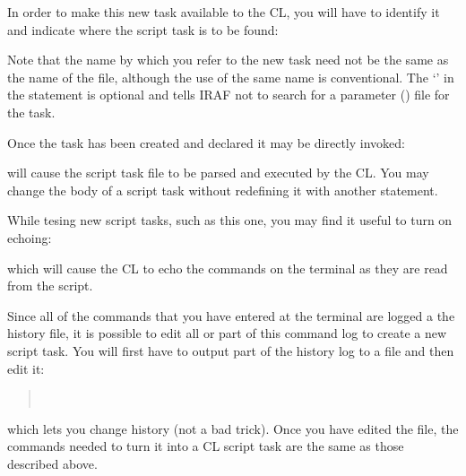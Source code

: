 \noindent
In order to make this new task available to the CL, you will have to identify
it and indicate where the script task is to be found:

\begin{quotation}\noindent
{} 
\end{quotation}

\noindent
Note that the name by which you refer to the new task
need not be the same as the name of the file, although the use of the same
name is conventional.
The `\usertype{\$}' in the  statement is optional and
tells IRAF not to search for a parameter () file for the task.

Once the task has been created and declared it may be directly invoked:

\begin{quotation}\noindent
{} 
\end{quotation}

\noindent
will cause the script task file to be parsed and executed by the CL.
You may change the body of a script task
without redefining it with another  statement.

While tesing new script tasks, such
as this one, you may find it useful to turn on echoing:

\begin{quotation}\noindent
{} 
\end{quotation}

\noindent
which will cause the CL to echo the commands on the terminal 
as they are read from the script.

Since all of the commands that you have entered at the terminal are 
logged a the history file, it is possible to edit all or part 
of this command log to create a new script task.  You will first have 
to output part of the history log to a file and then edit it:

\begin{quotation}\noindent
{}  \\
 
\end{quotation}

\noindent
which lets you change history (not a bad trick).  Once you have edited
the file, the commands needed to turn it into 
a CL script task are the same as those described above.

